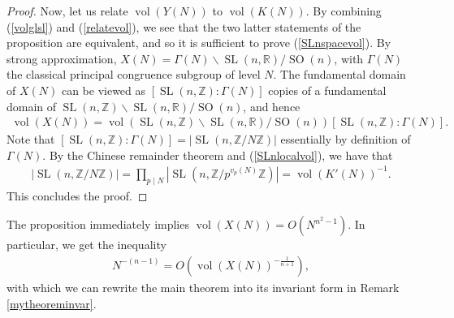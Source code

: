 \documentclass[11pt,reqno]{amsart}
\numberwithin{equation}{section}
\theoremstyle{definition}
\theoremstyle{remark}
\newcommand{\SL}{\operatorname{SL}}
\newcommand{\SO}{\operatorname{SO}}
\newcommand{\vol}{\operatorname{vol}}
\newcommand{\Z}{\mathbb{Z}}
\newcommand{\R}{\mathbb{R}}
\begin{document}
\begin{proof}
Now, let us relate $\vol(Y(N))$ to $\vol(K(N))$. By combining (\ref{volglsl}) and (\ref{relatevol}), we see that the two latter statements of the proposition are equivalent, and so it is sufficient to prove (\ref{SLnspacevol}). By strong approximation, $X(N) =\Gamma(N)\backslash\SL(n,\R)/\SO(n)$, with $\Gamma(N)$ the classical principal congruence subgroup of level $N$. The fundamental domain of $X(N)$ can be viewed as $[\SL(n,\Z):\Gamma(N)]$ copies of a fundamental domain of $\SL(n,\Z)\backslash \SL(n,\R)/\SO(n)$, and hence
\begin{align*}
    \vol(X(N)) = \vol(\SL(n,\Z)\backslash \SL(n,\R)/\SO(n))[\SL(n,\Z):\Gamma(N)].
\end{align*}
Note that $[\SL(n,\Z):\Gamma(N)] = |\SL(n,\Z/N\Z)|$ essentially by definition of $\Gamma(N)$. By the Chinese remainder theorem and (\ref{SLnlocalvol}), we have that
\begin{align*}
    |\SL(n,\Z/N\Z)| = \prod_{p\mid N}|\SL(n,\Z/p^{v_p(N)}\Z)| = \vol(K'(N))^{-1}.
\end{align*}
This concludes the proof.
\end{proof}

\noindent The proposition immediately implies $\vol(X(N)) = O(N^{n^2-1})$. In particular, we get the inequality
\begin{align*}
    N^{-(n-1)}= O\left(\vol(X(N))^{-\frac{1}{n+1}}\right),
\end{align*}
with which we can rewrite the main theorem into its invariant form in Remark \ref{mytheoreminvar}.

\bigskip



\pagebreak

 
\end{document}
